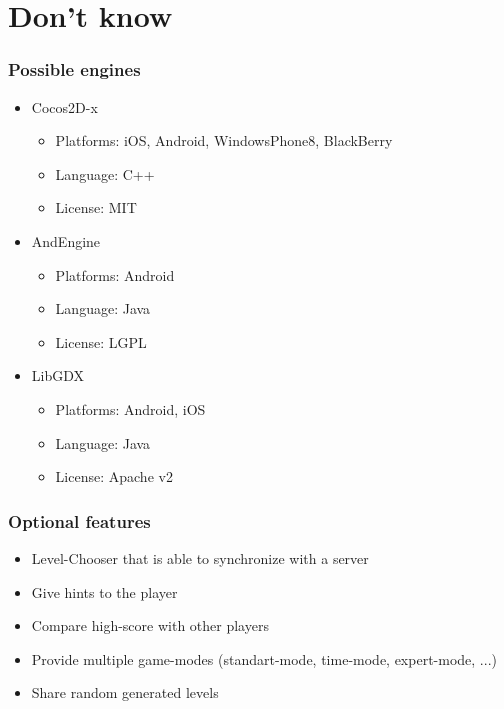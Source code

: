 \documentclass[xcolor=dvipsnames]{beamer}
\begin{document}
\section{Don't know}
\begin{frame}
  \frametitle{Possible engines}
  \begin{itemize}
  \item Cocos2D-x
    \begin{itemize}
    \item Platforms: iOS, Android, WindowsPhone8, BlackBerry
    \item Language: C++
    \item License: MIT
    \end{itemize}
  \item AndEngine
    \begin{itemize}
    \item Platforms: Android
    \item Language: Java
    \item License: LGPL
    \end{itemize}
  \item LibGDX
    \begin{itemize}
    \item Platforms: Android, iOS
    \item Language: Java
    \item License: Apache v2
    \end{itemize}
  \end{itemize}
\end{frame}
\begin{frame}
  \frametitle{Optional features}
  \begin{itemize}
  \item Level-Chooser that is able to synchronize with a server
  \item Give hints to the player
  \item Compare high-score with other players
  \item Provide multiple game-modes (standart-mode, time-mode, expert-mode, ...)
  \item Share random generated levels
  \end{itemize}
\end{frame}
\end{document}
